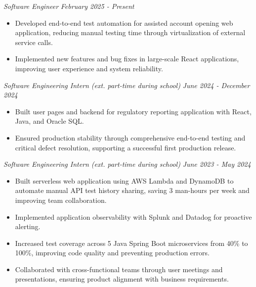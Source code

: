 \documentclass[letterpaper]{article}
\begin{document}
    \textit{Software Engineer} \hfill \textsl{February 2025 - Present}\\
    \vspace{-7pt}
    \begin{itemize} \itemsep -1mm

            \item Developed end-to-end test automation for assisted account opening web application, reducing manual testing time through virtualization of external service calls.

            \item Implemented new features and bug fixes in large-scale React applications, improving user experience and system reliability.

    \end{itemize}
    \vspace{-2mm}
    
    \textit{Software Engineering Intern (ext. part-time during school)} \hfill \textsl{June 2024 - December 2024}\\
    \vspace{-7pt}
    \begin{itemize} \itemsep -1mm

            \item Built user pages and backend for regulatory reporting application with React, Java, and Oracle SQL.
            
            \item Ensured production stability through comprehensive end-to-end testing and critical defect resolution, supporting a successful first production release.

    \end{itemize}
    \vspace{-2mm}


    \textit{Software Engineering Intern (ext. part-time during school)} \hfill \textsl{June 2023 - May 2024}\\
    \vspace{-7pt}
    \begin{itemize} \itemsep -1mm
        
            \item Built serverless web application using AWS Lambda and DynamoDB to automate manual API test history sharing, saving 3 man-hours per week and improving team collaboration.            
            
            \item Implemented application observability with Splunk and Datadog for proactive alerting.

            \item Increased test coverage across 5 Java Spring Boot microservices from 40\% to 100\%, improving code quality and preventing production errors.

            \item Collaborated with cross-functional teams through user meetings and presentations, ensuring product alignment with business requirements.
                
    \end{itemize}
    \vspace{-2mm}
\end{document}
